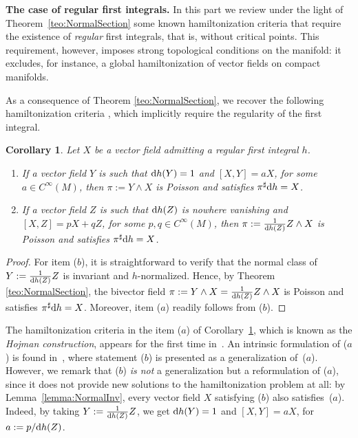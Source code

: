 \documentclass[pdftex]{sigma}%
\newcommand{\dd}{{\rm d}}
\numberwithin{equation}{section}
\newtheorem{Corollary}[Theorem]{Corollary}
\begin{document}
{\bf The case of regular first integrals.} In this part we review under the light of Theo\-rem~\ref{teo:NormalSection} some known hamiltonization criteria that require the existence of \emph{regular} first integrals, that is, without critical points. This requirement, however, imposes strong topological conditions on the manifold: it excludes, for instance, a global hamiltonization of vector fields on compact manifolds.

As a consequence of Theorem \ref{teo:NormalSection}, we recover the following hamiltonization criteria \cite{AHA-06,Hojman-96}, which implicitly require the regularity of the first integral.

\begin{Corollary}\label{cor:Hojman}
Let $X$ be a vector field admitting a regular first integral $h$.
 \begin{enumerate}\itemsep=0pt
 \item[$(a)$] If a vector field $Y$ is such that $\dd h(Y) = 1$ and $[X,Y] = aX$, for some $a \in C^{\infty}(M)$, then $\pi := Y \wedge X$ is Poisson and satisfies $\pi^{\sharp}\dd h = X$.
 \item[$(b)$] If a vector field $Z$ is such that $\dd h(Z)$ is nowhere vanishing and $[X,Z] = pX + qZ$, for some $p,q \in C^{\infty}(M)$, then $\pi := \tfrac{1}{\dd h(Z)}Z \wedge X$ is Poisson and satisfies $\pi^{\sharp}\dd h = X$.
 \end{enumerate}
\end{Corollary}
\begin{proof}
For item ($b$), it is straightforward to verify that the normal class of $Y := \tfrac{1}{\dd h(Z)}Z$ is invariant and $h$-normalized. Hence, by Theorem \ref{teo:NormalSection}, the bivector field $\pi := Y \wedge X = \tfrac{1}{\dd h(Z)}Z\wedge X$ is Poisson and satisfies $\pi^{\sharp}\dd h = X$. Moreover, item ($a$) readily follows from ($b$).
\end{proof}

The hamiltonization criteria in the item ($a$) of Corollary~\ref{cor:Hojman}, which is known as the \emph{Hojman construction}, appears for the first time in~\cite{Hojman-96}. An intrinsic formulation of ($a$) is found in~\cite{AHA-06}, where statement ($b$) is presented as a generalization of~($a$). However, we remark that ($b$) \emph{is not} a generalization but a reformulation of ($a$), since it does not provide new solutions to the hamiltonization problem at all: by Lemma~\ref{lemma:NormalInv}, every vector field $X$ satisfying ($b$) also satisfies~($a$). Indeed, by taking $Y := \tfrac{1}{\dd h(Z)}Z$, we get $\dd h(Y) = 1$ and $[X,Y] = aX$, for $a := {p}/{\dd h(Z)}$.
\end{document}
